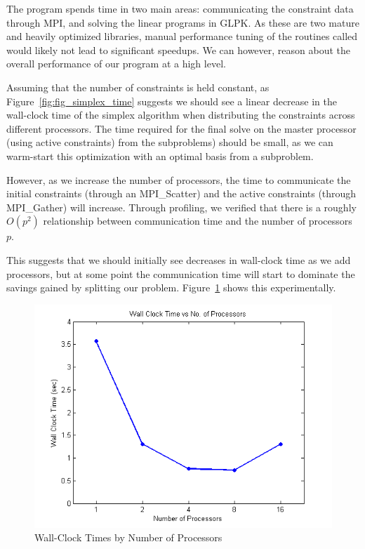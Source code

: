\documentclass[12pt]{article}
\begin{document}
The program spends time in two main areas: communicating the constraint data through MPI, and solving the linear programs in GLPK.  
As these are two mature and heavily optimized libraries, manual performance tuning of the routines called would likely not lead to significant speedups.
We can however, reason about the overall performance of our program at a high level.

Assuming that the number of constraints is held constant, as Figure~\ref{fig:fig_simplex_time} suggests we should see a linear decrease in the wall-clock time of the simplex algorithm when distributing the constraints across different processors.  
The time required for the final solve on the master processor (using active constraints) from the subproblems) should be small, as we can warm-start this optimization with an optimal basis from a subproblem.

However, as we increase the number of processors, the time to communicate the initial constraints (through an MPI\_Scatter) and the active constraints (through MPI\_Gather) will increase.
Through profiling, we verified that there is a roughly $O(p^2)$ relationship between communication time and the number of processors $p$.

This suggests that we should initially see decreases in wall-clock time as we add processors, but at some point the communication time will start to dominate the savings gained by splitting our problem.  Figure~\ref{fig:wct_numproc} shows this experimentally. 

\begin{figure}[ht]
    \centering
        \includegraphics{../plot/figs/wct_numproc.png}
    \caption{Wall-Clock Times by Number of Processors}
    \label{fig:wct_numproc}
\end{figure}
\end{document}
